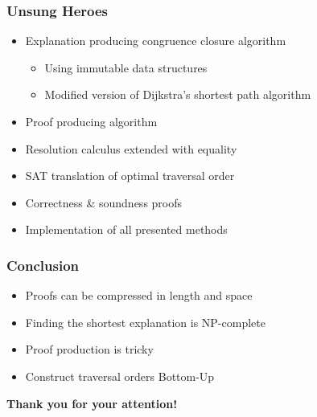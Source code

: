 \documentclass{beamer}
\begin{document}
\begin{frame}

\frametitle{Unsung Heroes}

\begin{itemize}
	\item Explanation producing congruence closure algorithm
	\begin{itemize}
		\item Using immutable data structures
		\item Modified version of Dijkstra's shortest path algorithm
	\end{itemize}
	\item Proof producing algorithm
	\item Resolution calculus extended with equality
	\item SAT translation of optimal traversal order
	\item Correctness \&  soundness proofs
	\item Implementation of all presented methods
\end{itemize}

\end{frame}

\begin{frame}

\frametitle{Conclusion}

\begin{itemize}
	\item Proofs can be compressed in length and space
	\item Finding the shortest explanation is NP-complete
	\item Proof production is tricky
	\item Construct traversal orders Bottom-Up
\end{itemize}

\end{frame}

\begin{frame}

\centering \textbf{\LARGE{Thank you for your attention!}}

\end{frame}
\end{document}
